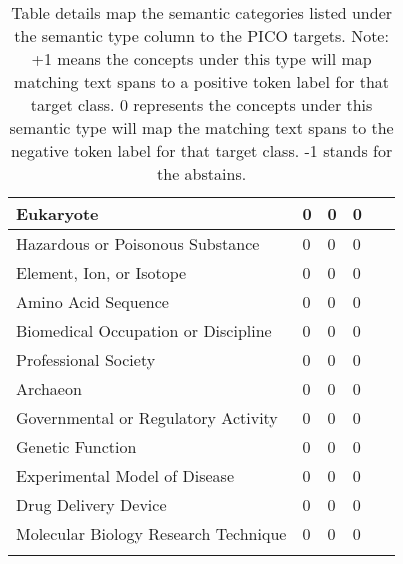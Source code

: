\documentclass[10.7pt,]{article}
\begin{document}
\begin{longtable}{|l|p{0.3cm}|p{0.3cm}|p{0.3cm}|p{7.9cm}|}
        Eukaryote & 0 & 0 & 0 & ~ \\ \hline
        Hazardous or Poisonous Substance & 0 & 0 & 0 & ~ \\ \hline
        Element, Ion, or Isotope & 0 & 0 & 0 & ~ \\ \hline
        Amino Acid Sequence & 0 & 0 & 0 & ~ \\ \hline
        Biomedical Occupation or Discipline & 0 & 0 & 0 & ~ \\ \hline
        Professional Society & 0 & 0 & 0 & ~ \\ \hline
        Archaeon & 0 & 0 & 0 & ~ \\ \hline
        Governmental or Regulatory Activity & 0 & 0 & 0 & ~ \\ \hline
        Genetic Function & 0 & 0 & 0 & ~ \\ \hline
        Experimental Model of Disease & 0 & 0 & 0 & ~ \\ \hline
        Drug Delivery Device & 0 & 0 & 0 & ~ \\ \hline
        Molecular Biology Research Technique & 0 & 0 & 0 & ~ \\ \hline
    \caption{Table details map the semantic categories listed under the semantic type column to the PICO targets. Note: +1 means the concepts under this type will map matching text spans to a positive token label for that target class. 0 represents the concepts under this semantic type will map the matching text spans to the negative token label for that target class. -1 stands for the abstains.}
    \label{tab:source2target}
\end{longtable}
%
%
%
\end{document}
